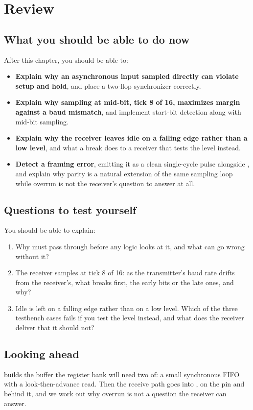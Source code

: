 
\section{Review}
\label{c3:sec:review}

\subsection*{What you should be able to do now}
After this chapter, you should be able to:
\begin{itemize}
  \item \textbf{Explain why an asynchronous input sampled directly can violate setup and hold}, and
    place a two-flop synchronizer correctly.
  \item \textbf{Explain why sampling at mid-bit, tick 8 of 16, maximizes margin against a baud
    mismatch}, and implement start-bit detection along with mid-bit sampling.
  \item \textbf{Explain why the receiver leaves idle on a falling edge rather than a low level}, and
    what a break does to a receiver that tests the level instead.
  \item \textbf{Detect a framing error}, emitting it as a clean single-cycle pulse alongside
    , and explain why parity is a natural extension of the same sampling loop while
    overrun is not the receiver's question to answer at all.
\end{itemize}

\subsection*{Questions to test yourself}
You should be able to explain:
\begin{enumerate}
  \item Why must  pass through  before any logic looks at it, and what can go
    wrong without it?
  \item The receiver samples at tick 8 of 16: as the transmitter's baud rate drifts from the
    receiver's, what breaks first, the early bits or the late ones, and why?
  \item Idle is left on a falling edge rather than on a low level. Which of the three testbench
    cases fails if you test the level instead, and what does the receiver deliver that it should
    not?
\end{enumerate}

\subsection*{Looking ahead}
 builds the buffer the register bank will need two of: a small synchronous FIFO with a
look-then-advance read. Then the receive path goes into ,  on the pin and
 behind it, and we work out why overrun is not a question the receiver can answer.
